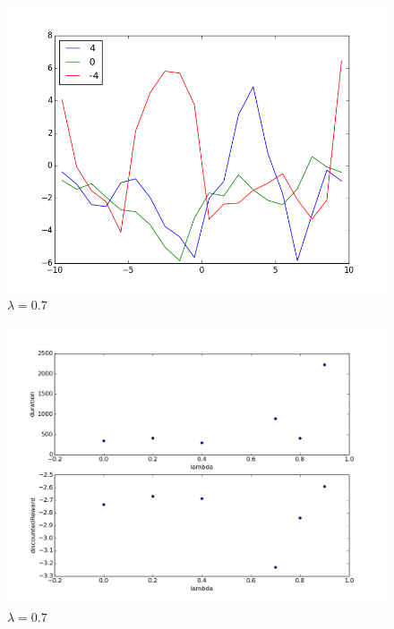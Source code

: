 \documentclass{article}
\begin{document}
\begin{figure}
\centering
\includegraphics[scale=0.5]{figures/sarsa_cts_weights.png}
\caption{$\lambda = 0.7$}
\label{figures/sarsa_cts_weights.png}
\end{figure}



\begin{figure}
\centering
\includegraphics[scale=0.5]{figures/discreteSARSALamComparison.png}
\caption{$\lambda = 0.7$}
\label{figures/discreteSARSALamComparison.png}
\end{figure}
\end{document}
